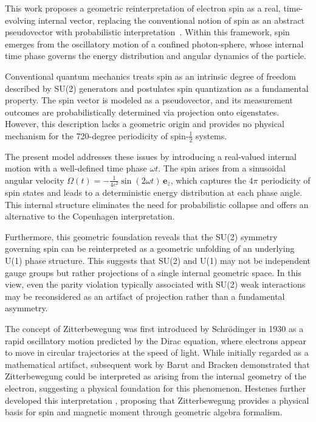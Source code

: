 \documentclass[%
 reprint,
 amsmath,amssymb,
 aps,
]{revtex4-1}
\numberwithin{equation}{section}%
\begin{document}
This work proposes a geometric reinterpretation of electron spin as a real, time-evolving internal vector, replacing the conventional notion of spin as an abstract pseudovector with probabilistic interpretation~\cite{uhlenbeck1925}. Within this framework, spin emerges from the oscillatory motion of a confined photon-sphere, whose internal time phase governs the energy distribution and angular dynamics of the particle.

Conventional quantum mechanics treats spin as an intrinsic degree of freedom described by SU(2) generators and postulates spin quantization as a fundamental property. The spin vector is modeled as a pseudovector, and its measurement outcomes are probabilistically determined via projection onto eigenstates. However, this description lacks a geometric origin and provides no physical mechanism for the 720-degree periodicity of spin-$\frac{1}{2}$ systems.

The present model addresses these issues by introducing a real-valued internal motion with a well-defined time phase $\omega t$. The spin arises from a sinusoidal angular velocity $\Omega(t) = -\frac{1}{4c^2} \sin(2\omega t) \, \mathbf{e}_z$, which captures the $4\pi$ periodicity of spin states and leads to a deterministic energy distribution at each phase angle. This internal structure eliminates the need for probabilistic collapse and offers an alternative to the Copenhagen interpretation.

Furthermore, this geometric foundation reveals that the SU(2) symmetry governing spin can be reinterpreted as a geometric unfolding of an underlying U(1) phase structure. This suggests that SU(2) and U(1) may not be independent gauge groups but rather projections of a single internal geometric space. In this view, even the parity violation typically associated with SU(2) weak interactions may be reconsidered as an artifact of projection rather than a fundamental asymmetry.

The concept of Zitterbewegung was first introduced by Schrödinger in 1930 \cite{schrodinger1930} as a rapid oscillatory motion predicted by the Dirac equation, where electrons appear to move in circular trajectories at the speed of light. While initially regarded as a mathematical artifact, subsequent work by Barut and Bracken \cite{barut1981} demonstrated that Zitterbewegung could be interpreted as arising from the internal geometry of the electron, suggesting a physical foundation for this phenomenon. Hestenes further developed this interpretation \cite{hestenes1990}, proposing that Zitterbewegung provides a physical basis for spin and magnetic moment through geometric algebra formalism.
\end{document}
